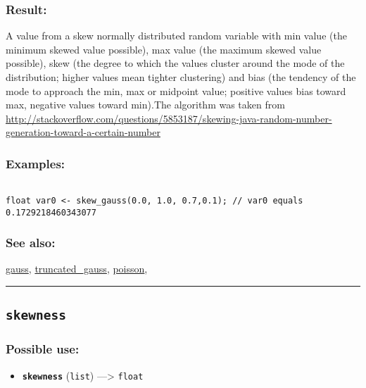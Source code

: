 \documentclass[]{book}
\providecommand{\tightlist}{%
  \setlength{\itemsep}{0pt}\setlength{\parskip}{0pt}}
\theoremstyle{definition}
\theoremstyle{definition}
\theoremstyle{definition}
\theoremstyle{remark}
\begin{document}
\subsubsection{Result:}\label{result-465}

A value from a skew normally distributed random variable with min value
(the minimum skewed value possible), max value (the maximum skewed value
possible), skew (the degree to which the values cluster around the mode
of the distribution; higher values mean tighter clustering) and bias
(the tendency of the mode to approach the min, max or midpoint value;
positive values bias toward max, negative values toward min).The
algorithm was taken from
\url{http://stackoverflow.com/questions/5853187/skewing-java-random-number-generation-toward-a-certain-number}

\subsubsection{Examples:}\label{examples-336}

\begin{verbatim}
 
float var0 <- skew_gauss(0.0, 1.0, 0.7,0.1); // var0 equals 0.1729218460343077
\end{verbatim}

\subsubsection{See also:}\label{see-also-187}

\href{OperatorsDH\#gauss}{gauss},
\href{OperatorsSZ\#truncated_gauss}{truncated\_gauss},
\href{OperatorsNR\#poisson}{poisson},

\begin{center}\rule{0.5\linewidth}{\linethickness}\end{center}

\subsection{\texorpdfstring{\texttt{skewness}}{skewness}}\label{skewness}

\subsubsection{Possible use:}\label{possible-use-482}

\begin{itemize}
\tightlist
\item
  \textbf{\texttt{skewness}} (\texttt{list}) ---\textgreater{}
  \texttt{float}
\end{itemize}
\end{document}

